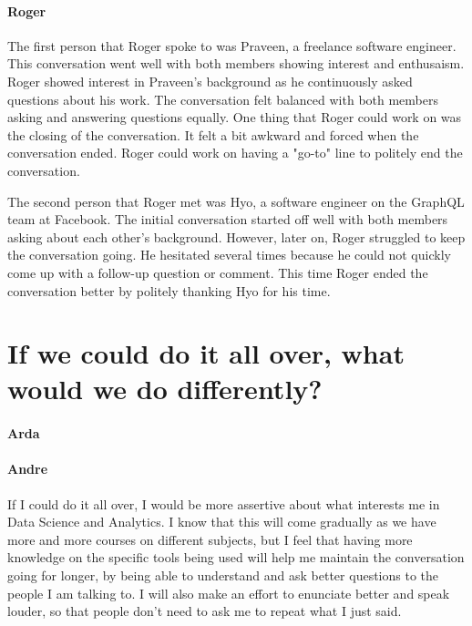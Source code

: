 \documentclass[]{article}
\let\oldparagraph\paragraph
\renewcommand{\paragraph}[1]{\oldparagraph{#1}\mbox{}}
\begin{document}
\paragraph{Roger}
The first person that Roger spoke to was Praveen, a freelance software engineer. This conversation went well with both members showing interest and enthusaism. Roger showed interest in Praveen's background as he continuously asked questions about his work. The conversation felt balanced with both members asking and answering questions equally. One thing that Roger could work on was the closing of the conversation. It felt a bit awkward and forced when the conversation ended. Roger could work on having a "go-to" line to politely end the conversation. 

The second person that Roger met was Hyo, a software engineer on the GraphQL team at Facebook. The initial conversation started off well with both members asking about each other's background. However, later on, Roger struggled to keep the conversation going. He hesitated several times because he could not quickly come up with a follow-up question or comment. This time Roger ended the conversation better by politely thanking Hyo for his time.



\section*{If we could do it all over, what would we do differently?}
\paragraph{Arda}




\paragraph{Andre}
If I could do it all over, I would be more assertive about what interests me in Data Science and Analytics. I know that this will come gradually as we have more and more courses on different subjects, but I feel that having more knowledge on the specific tools being used will help me maintain the conversation going for longer, by being able to understand and ask better questions to the people I am talking to. I will also make an effort to enunciate better and speak louder, so that people don't need to ask me to repeat what I just said.
\end{document}
